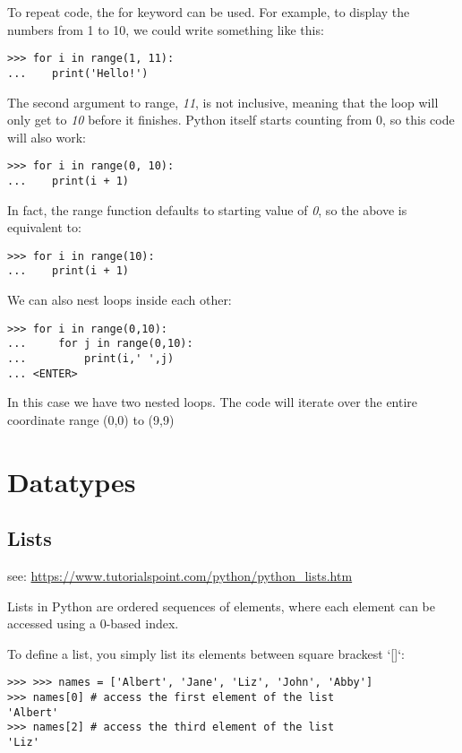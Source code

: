 To repeat code, the for keyword can be used. For example, to display the
numbers from 1 to 10, we could write something like this:

\begin{verbatim}
>>> for i in range(1, 11):
...    print('Hello!')
\end{verbatim}

The second argument to range, \emph{11}, is not inclusive, meaning that
the loop will only get to \emph{10} before it finishes. Python itself
starts counting from 0, so this code will also work:

\begin{verbatim}
>>> for i in range(0, 10):
...    print(i + 1)
\end{verbatim}

In fact, the range function defaults to starting value of \emph{0}, so
the above is equivalent to:

\begin{verbatim}
>>> for i in range(10):
...    print(i + 1)
\end{verbatim}

We can also nest loops inside each other:

\begin{verbatim}
>>> for i in range(0,10):
...     for j in range(0,10):
...         print(i,' ',j)
... <ENTER>
\end{verbatim}

In this case we have two nested loops. The code will iterate over the
entire coordinate range (0,0) to (9,9)

\section{Datatypes}\label{datatypes}

\subsection{Lists}\label{lists}

see: \url{https://www.tutorialspoint.com/python/python_lists.htm}

Lists in Python are ordered sequences of elements, where each element
can be accessed using a 0-based index.

To define a list, you simply list its elements between square brackest
`{[}{]}`:

\begin{verbatim}
>>> >>> names = ['Albert', 'Jane', 'Liz', 'John', 'Abby']
>>> names[0] # access the first element of the list
'Albert'
>>> names[2] # access the third element of the list
'Liz'
\end{verbatim}

